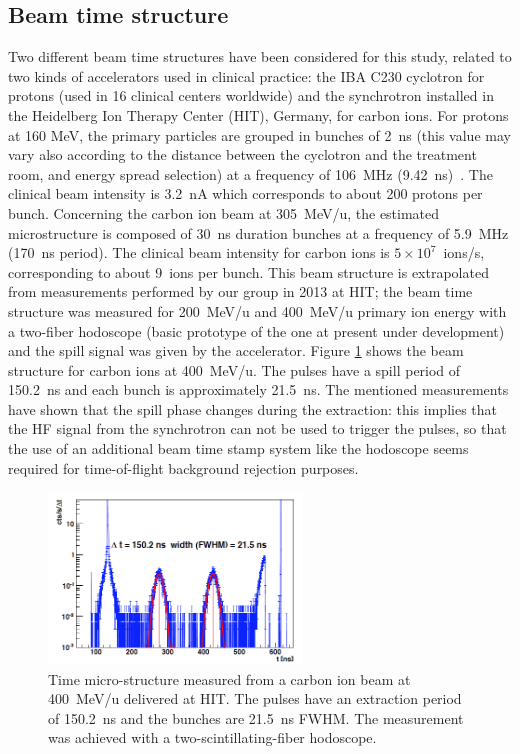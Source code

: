 \subsection{Beam time structure}
\label{subsection:modelisation_fasceau_ions_CC_hadrontherapy_Geant4}
 
Two different beam time structures have been considered for this study, related to two kinds of accelerators used in clinical practice: the IBA C230 cyclotron for protons (used in 16 clinical centers worldwide) and the synchrotron installed in the Heidelberg Ion Therapy Center (HIT), Germany, for carbon ions. For protons at 160 MeV, the primary particles are grouped in bunches of 2~ns (this value may vary also according to the distance between the cyclotron and the treatment room, and energy spread selection) at a frequency of 106~MHz (9.42~ns)~\cite{f_roellinghoff_real-time_2014}. The clinical beam intensity is 3.2~nA which corresponds to about 200 protons per bunch. Concerning the carbon ion beam at 305~MeV/u, the estimated microstructure is composed of 30~ns duration bunches at a frequency of 5.9~MHz (170~ns period). The clinical beam intensity for carbon ions is $5\times10^7$~ions/s, corresponding to about 9~ions per bunch. This beam structure is extrapolated from measurements performed by our group in 2013 at HIT; the beam time structure was measured for 200~MeV/u and 400~MeV/u primary ion energy with a two-fiber hodoscope (basic prototype of the one at present under development) and the spill signal was given by the accelerator. Figure \ref{fig:fig_structure_temps_faisceau_HIT_2013_CC_simulation_Hadronth} shows the beam structure for carbon ions at 400~MeV/u. The pulses have a spill period of 150.2~ns and each bunch is approximately 21.5~ns.
The mentioned measurements have shown that the spill phase changes during the extraction: this implies that the HF signal from the synchrotron can not be used to trigger the pulses, so that the use of an additional beam time stamp system like the hodoscope seems required for time-of-flight background rejection purposes.

\begin{figure} [!hbtp]	
  \centering
  \includegraphics[width=0.6\textwidth]{./Figure/2013_Structure_Time_Beam_400MeV.png}
  \caption{Time micro-structure measured from a carbon ion beam at 400~MeV/u delivered at HIT. The pulses have an extraction period of 150.2~ns and the bunches are 21.5~ns FWHM. The measurement was achieved with a two-scintillating-fiber hodoscope.}
  \label{fig:fig_structure_temps_faisceau_HIT_2013_CC_simulation_Hadronth}
\end{figure}


